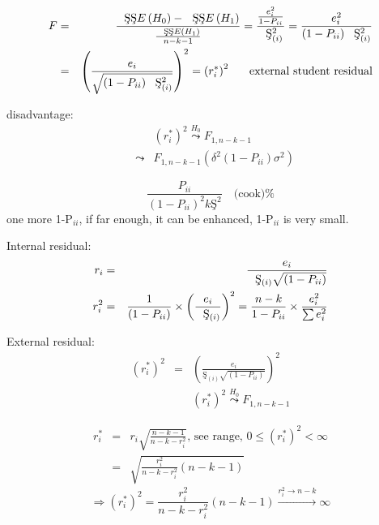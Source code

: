 \documentclass{article}
\begin{document}
\bigskip

\begin{eqnarray*}
F &=&\frac{\text{\c{S}\c{S}}E\left( H_{0}\right) -\text{\c{S}\c{S}}E\left(
H_{1}\right) }{\frac{\text{\c{S}\c{S}}E\left( H_{1}\right) }{n-k-1}}=\frac{%
\frac{e_{i}^{2}}{1-P_{ii}}}{\text{\c{S}}_{\left( i\right) }^{2}}=\frac{%
e_{i}^{2}}{\left( 1-P_{ii}\right) \text{\c{S}}_{\left( i\right) }^{2}} \\
&=&\left( \frac{e_{i}}{\sqrt{\left( 1-P_{ii}\right) \text{\c{S}}_{\left(
i\right) }^{2}}}\right) ^{2}=\left( r_{i}^{\ast }\right) ^{2}\quad \text{%
external student residual}
\end{eqnarray*}

\bigskip

disadvantage:%
\begin{eqnarray*}
&&\left( r_{i}^{\ast }\right) ^{2}\overset{H_{0}}{\leadsto }F_{1,n-k-1} \\
&\leadsto &F_{1,n-k-1}\left( \delta ^{2}\left( 1-P_{ii}\right) \sigma
^{2}\right)
\end{eqnarray*}

\bigskip

\begin{equation*}
\frac{P_{ii}}{\left( 1-P_{ii}\right) ^{2}k\text{\c{S}}^{2}}\quad \text{(cook)%
}
\end{equation*}%
one more 1-P$_{ii}$, if far enough, it can be enhanced, 1-P$_{ii}$ is very
small.

\bigskip

Internal residual:%
\begin{eqnarray*}
r_{i} &=&\frac{e_{i}}{\text{\c{S}}_{\left( i\right) }\sqrt{\left(
1-P_{ii}\right) }} \\
r_{i}^{2} &=&\frac{1}{\left( 1-P_{ii}\right) }\times \left( \frac{e_{i}}{%
\text{\c{S}}_{\left( i\right) }}\right) ^{2}=\frac{n-k}{1-P_{ii}}\times 
\frac{e_{i}^{2}}{\tsum e_{i}^{2}}
\end{eqnarray*}

External residual:%
\begin{eqnarray*}
\left( r_{i}^{\ast }\right) ^{2} &=&\left( \frac{e_{i}}{\text{\c{S}}_{\left(
i\right) }\sqrt{\left( 1-P_{ii}\right) }}\right) ^{2} \\
&&\left( r_{i}^{\ast }\right) ^{2}\overset{H_{0}}{\leadsto }F_{1,n-k-1}
\end{eqnarray*}

\begin{eqnarray*}
r_{i}^{\ast } &=&r_{i}\sqrt{\frac{n-k-1}{n-k-r_{i}^{2}}}\text{, see range, }%
0\leq \left( r_{i}^{\ast }\right) ^{2}<\infty  \\
&=&\sqrt{\frac{r_{i}^{2}}{n-k-r_{i}^{2}}\left( n-k-1\right) }
\end{eqnarray*}%
\begin{equation*}
\Rightarrow \left( r_{i}^{\ast }\right) ^{2}=\frac{r_{i}^{2}}{n-k-r_{i}^{2}}%
\left( n-k-1\right) \overset{r_{i}^{2}\rightarrow n-k}{\longrightarrow }%
\infty 
\end{equation*}
\end{document}
